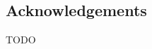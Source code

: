 \vspace*{\fill}
\begin{adjustwidth}{55pt}{55pt}
\section*{Acknowledgements}
TODO
\end{adjustwidth}
\vspace*{\fill}
